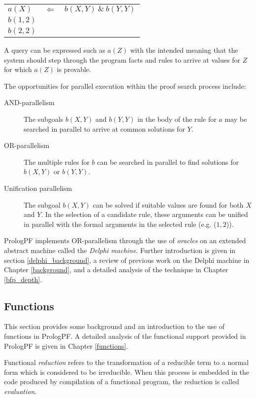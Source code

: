 \begin{tabular}{l l l}
$a(X)$   &$\Leftarrow$ &$b(X,Y)\  \&\  b(Y,Y)$\\
$b(1,2)$ &             &\\
$b(2,2)$ &             &\\
\end{tabular}

A query can be expressed such as $a(Z)$
with the intended meaning that the system should
step through the program facts and rules to arrive at values for $Z$
for which $a(Z)$ is provable.

The opportunities for parallel execution
within the proof search process include:
\begin{description}
\item[AND-parallelism]{The subgoals $b(X,Y)$ and $b(Y,Y)$
  in the body of the rule for $a$ may be searched in
  parallel to arrive at common solutions for $Y.$}
\item[OR-parallelism]{The multiple rules for $b$ can be searched in
  parallel to find solutions for $b(X,Y)$ or $b(Y,Y)$.}
\item[Unification parallelism]{The subgoal $b(X,Y)$ can be solved if
  suitable values are found for both $X$ and $Y.$  In the selection of
  a candidate rule, these arguments can be unified in parallel with the
  formal arguments in the selected rule (e.g. ($1,2$)).}
\end{description}

PrologPF implements OR-parallelism through the use of \textit{oracles}
on an extended abstract machine called the \textit{Delphi machine}.
Further introduction is given in section \ref{delphi_background}, a
review of previous work on the Delphi machine in Chapter \ref{background},
and a detailed analysis of the technique in Chapter \ref{bfp_depth}.

\subsection{Functions}

This section provides some background and an introduction to the use
of functions in PrologPF.
A detailed analysis of the functional support provided in PrologPF is
given in Chapter \ref{functions}.

Functional \textit{reduction} refers to the transformation of a reducible
term to a normal form which is
considered to be irreducible.  When this process is
embedded in the code produced by compilation of a functional program, the
reduction is called \textit{evaluation}.

